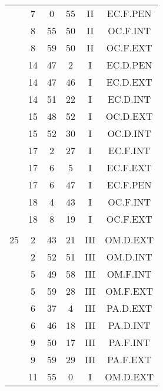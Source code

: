 \documentclass[12pt, a4paper]{article}
\begin{document}
\begin{multicols}{3}
{\begin{tabular}{c c c c c c}
	 	 	 	 & 7 & 0 & 55 & II & EC.F.PEN\\%
	 	 	 	 & 8 & 55 & 50 & II & OC.F.INT\\%
	 	 	 	 & 8 & 59 & 50 & II & OC.F.EXT\\%
	 	 	 	 & 14 & 47 & 2 & I & EC.D.PEN\\%
	 	 	 	 & 14 & 47 & 46 & I & EC.D.EXT\\%
	 	 	 	 & 14 & 51 & 22 & I & EC.D.INT\\%
	 	 	 	 & 15 & 48 & 52 & I & OC.D.EXT\\%
	 	 	 	 & 15 & 52 & 30 & I & OC.D.INT\\%
	 	 	 	 & 17 & 2 & 27 & I & EC.F.INT\\%
	 	 	 	 & 17 & 6 & 5 & I & EC.F.EXT\\%
	 	 	 	 & 17 & 6 & 47 & I & EC.F.PEN\\%
	 	 	 	 & 18 & 4 & 43 & I & OC.F.INT\\%
	 	 	 	 & 18 & 8 & 19 & I & OC.F.EXT\\%
	 	 	 	 & & & & & \\%
	 	 	 	25 & 2 & 43 & 21 & III & OM.D.EXT\\%
	 	 	 	 & 2 & 52 & 51 & III & OM.D.INT\\%
	 	 	 	 & 5 & 49 & 58 & III & OM.F.INT\\%
	 	 	 	 & 5 & 59 & 28 & III & OM.F.EXT\\%
	 	 	 	 & 6 & 37 & 4 & III & PA.D.EXT\\%
	 	 	 	 & 6 & 46 & 18 & III & PA.D.INT\\%
	 	 	 	 & 9 & 50 & 17 & III & PA.F.INT\\%
	 	 	 	 & 9 & 59 & 29 & III & PA.F.EXT\\%
	 	 	 	 & 11 & 55 & 0 & I & OM.D.EXT\\%

\end{tabular}}
\end{multicols}
\end{document}
